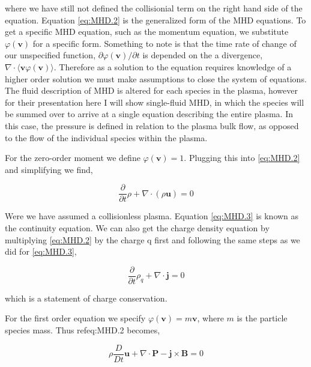 \documentclass[utf8]{report}
\begin{document}
where we have still not defined the collisionial term on the right hand side of the equation. Equation \ref{eq:MHD.2} is the generalized form of the MHD equations. To get a specific MHD equation, such as the momentum equation, we substitute $\varphi(\textbf{v})$ for a specific form. Something to note is that the time rate of change of our unspecified function, $\partial \varphi(\textbf{v}) / \partial t$ is depended on the a divergence, $\nabla \cdot \langle \textbf{v} \varphi(\textbf{v}) \rangle$. Therefore as a solution to the equation requires knowledge of a higher order solution we must make assumptions to close the system of equations. The fluid description of MHD is altered for each species in the plasma, however for their presentation here I will show single-fluid MHD, in which the species will be summed over to arrive at a single equation describing the entire plasma. In this case, the pressure is defined in relation to the plasma bulk flow, as opposed to the flow of the individual species within the plasma. 

For the zero-order moment we define $\varphi(\textbf{v}) = 1$. Plugging this into \ref{eq:MHD.2}%
and simplifying we find, 

\begin{equation}
    \frac{\partial}{\partial t} \rho + \nabla \cdot (\rho \textbf{u}) = 0
    \label{eq:MHD.3}
\end{equation}

Were we have assumed a collisionless plasma. Equation \ref{eq:MHD.3} is known as the continuity equation. We can also get the charge density equation by multiplying \ref{eq:MHD.2} by the charge q first and following the same steps as we did for \ref{eq:MHD.3}, 

\begin{equation}
    \frac{\partial}{\partial t} \rho_{q} + \nabla \cdot \textbf{j} = 0
    \label{eq:MHD.4}
\end{equation}

which is a statement of charge conservation. 

For the first order equation we specify $\varphi(\textbf{v}) = m\textbf{v}$, where $m$ is the particle species mass. Thus ref{eq:MHD.2} becomes, 

\begin{equation}
    \rho \frac{D}{Dt} \textbf{u} + \nabla \cdot \textbf{P} - \textbf{j} \times \textbf{B} = 0
    \label{eq:MHD.5}
\end{equation}
\end{document}
